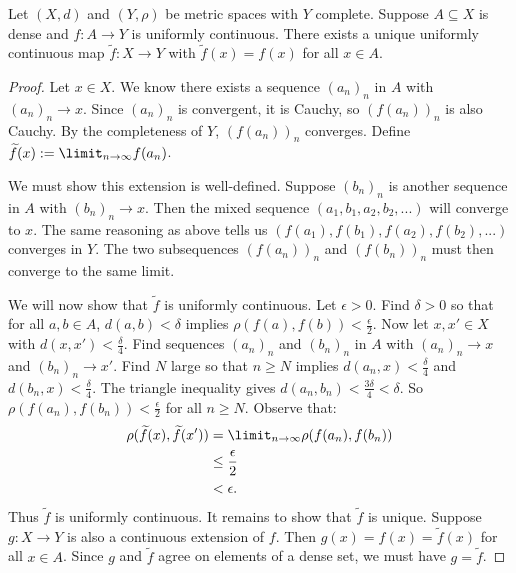     \begin{theorem}\label{thm:unif-cont-extension}
        Let $(X,d)$ and $(Y,\rho)$ be metric spaces with $Y$ complete. Suppose $A \subseteq X$ is dense and $f:A \rightarrow Y$ is uniformly continuous. There exists a unique uniformly continuous map $\widetilde{f}:X \rightarrow Y$ with $\widetilde{f}(x) = f(x)$ for all $x \in A$.
    \end{theorem}
        \begin{proof}
            Let $x \in X$. We know there exists a sequence $(a_n)_n$ in $A$ with $(a_n)_n \rightarrow x$. Since $(a_n)_n$ is convergent, it is Cauchy, so $(f(a_n))_n$ is also Cauchy. By the completeness of $Y$, $(f(a_n))_n$ converges. Define $\widetilde{f}(x) := \limit_{n \rightarrow \infty}f(a_n)$.

            We must show this extension is well-defined. Suppose $(b_n)_n$ is another sequence in $A$ with $(b_n)_n \rightarrow x$. Then the mixed sequence $(a_1,b_1,a_2,b_2,...)$ will converge to $x$. The same reasoning as above tells us $(f(a_1),f(b_1),f(a_2),f(b_2),...)$ converges in $Y$. The two subsequences $(f(a_n))_n$ and $(f(b_n))_n$ must then converge to the same limit.

            We will now show that $\widetilde{f}$ is uniformly continuous. Let $\epsilon > 0$. Find $\delta > 0$ so that for all $a,b \in A$, $d(a,b) < \delta$ implies $\rho(f(a),f(b)) < \frac{\epsilon}{2}$. Now let $x,x' \in X$ with $d(x,x') < \frac{\delta}{4}$. Find sequences $(a_n)_n$ and $(b_n)_n$ in $A$ with $(a_n)_n \rightarrow x$ and $(b_n)_n \rightarrow x'$. Find $N$ large so that $n \geq N$ implies $d(a_n,x) < \frac{\delta}{4}$ and $d(b_n,x) < \frac{\delta}{4}$. The triangle inequality gives $d(a_n,b_n) < \frac{3\delta}{4} < \delta$. So $\rho(f(a_n),f(b_n)) < \frac{\epsilon}{2}$ for all $n \geq N$. Observe that:
                \begin{equation*}
                \begin{split}
                    \rho(\widetilde{f}(x),\widetilde{f}(x'))
                    & = \limit_{n \rightarrow \infty} \rho(f(a_n),f(b_n)) \\
                    & \leq \frac{\epsilon}{2} \\
                    & < \epsilon.
                \end{split}
                \end{equation*}
            Thus $\widetilde{f}$ is uniformly continuous. It remains to show that $\widetilde{f}$ is unique. Suppose $g:X\rightarrow Y$ is also a continuous extension of $f$. Then $g(x) = f(x) = \widetilde{f}(x)$ for all $x \in A$. Since $g$ and $\widetilde{f}$ agree on elements of a dense set, we must have $g = \widetilde{f}$.
        \end{proof}

